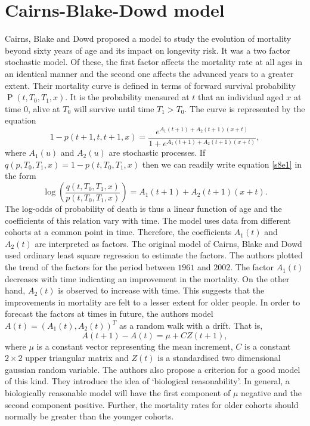 \documentclass{article}
\numberwithin{equation}{section}
\DeclareMathOperator{\pr}{P}
\begin{document}
\section{Cairns-Blake-Dowd model}\label{s8}
Cairns, Blake and Dowd proposed a model \cite{cairns2006two} to study the
evolution of mortality beyond sixty years of age and its impact on longevity
risk. It was a two factor stochastic model. Of these, the first factor affects
the mortality rate at all ages in an identical manner and the second one 
affects the advanced years to a greater extent. Their mortality curve is
defined in terms of forward survival probability $\pr(t, T_0, T_1, x)$. It is
the probability measured at $t$ that an individual aged $x$ at time $0$,
alive at $T_0$ will survive until time $T_1 > T_0$. The curve is represented
by the equation
\begin{equation}\label{s8e1}
1 - p(t+1,t,t+1,x) = 
\frac{e^{A_1(t+1)+A_2(t+1)(x+t)}}{1+e^{A_1(t+1)+A_2(t+1)(x+t)}},
\end{equation}
where $A_1(u)$ and $A_2(u)$ are stochastic processes. If $q(p, T_0, T_1, x)
= 1 - p(t, T_0, T_1, x)$ then we can readily write equation \eqref{s8e1} in
the form
\begin{equation}\label{s8e2}
\log\left(\frac{q(t,T_0,T_1,x)}{p(t,T_0,T_1,x)}\right) = 
A_1(t+1) + A_2(t+1)(x+t).
\end{equation}
The log-odds of probability of death is thus a linear function of age and the
coefficients of this relation vary with time. The model uses data from 
different cohorts at a common point in time. Therefore, the coefficients 
$A_1(t)$ and $A_2(t)$ are interpreted as factors. The original model of Cairns,
Blake and Dowd used ordinary least square regression to estimate the factors.
The authors plotted the trend of the factors for the period between $1961$ and
$2002$. The factor $A_1(t)$ decreases with time indicating an improvement in
the mortality. On the other hand, $A_2(t)$ is observed to increase with time.
This suggests that the improvements in mortality are felt to a lesser extent 
for older people. In order to forecast the factors at times in future, the 
authors model $A(t) = (A_1(t), A_2(t))^T$ as a random walk with a drift. That
is,
\begin{equation}\label{s8e3}
A(t+1) - A(t) = \mu + CZ(t+1),
\end{equation}
where $\mu$ is a constant vector representing the mean increment, $C$ is a 
constant $2 \times 2$ upper triangular matrix and $Z(t)$ is a standardised
two dimensional gaussian random variable. The authors also propose a criterion
for a good model of this kind. They introduce the idea of `biological 
reasonability'. In general, a biologically reasonable model will have the 
first component of $\mu$ negative and the second component positive. Further,
the mortality rates for older cohorts should normally be greater than the 
younger cohorts.
\end{document}
